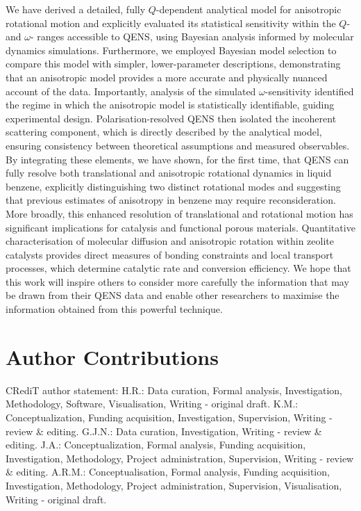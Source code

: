\documentclass[reprint,
               superscriptaddress,
               nobibnotes,
               amsmath,
               amssymb,
               aps,
               hidelinks, 
               pre]{revtex4-2}
\begin{document}

We have derived a detailed, fully $Q$-dependent analytical model for anisotropic rotational motion and explicitly evaluated its statistical sensitivity within the $Q$- and $\omega$- ranges accessible to QENS, using Bayesian analysis informed by molecular dynamics simulations. 
Furthermore, we employed Bayesian model selection to compare this model with simpler, lower-parameter descriptions, demonstrating that an anisotropic model provides a more accurate and physically nuanced account of the data. 
Importantly, analysis of the simulated $\omega$-sensitivity identified the regime in which the anisotropic model is statistically identifiable, guiding experimental design. 
Polarisation-resolved QENS then isolated the incoherent scattering component, which is directly described by the analytical model, ensuring consistency between theoretical assumptions and measured observables.
By integrating these elements, we have shown, for the first time, that QENS can fully resolve both translational and anisotropic rotational dynamics in liquid benzene, explicitly distinguishing two distinct rotational modes and suggesting that previous estimates of anisotropy in benzene may require reconsideration.
More broadly, this enhanced resolution of translational and rotational motion has significant implications for catalysis and functional porous materials. 
Quantitative characterisation of molecular diffusion and anisotropic rotation within zeolite catalysts provides direct measures of bonding constraints and local transport processes, which determine catalytic rate and conversion efficiency.
We hope that this work will inspire others to consider more carefully the information that may be drawn from their QENS data and enable other researchers to maximise the information obtained from this powerful technique. 

\section*{Author Contributions}

CRediT author statement: 
H.R.: Data curation, Formal analysis, Investigation, Methodology, Software, Visualisation, Writing - original draft.
K.M.: Conceptualization, Funding acquisition, Investigation, Supervision, Writing - review \& editing. 
G.J.N.: Data curation, Investigation, Writing - review \& editing. 
J.A.: Conceptualization, Formal analysis, Funding acquisition, Investigation, Methodology, Project administration, Supervision, Writing - review \& editing. 
A.R.M.: Conceptualisation, Formal analysis, Funding acquisition, Investigation, Methodology, Project administration, Supervision, Visualisation, Writing - original draft. \\
\end{document}
